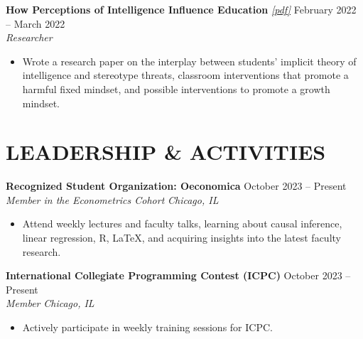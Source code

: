 \documentclass[letterpaper, 9pt]{extarticle}
\begin{document}
\noindent
\textbf{How Perceptions of Intelligence Influence Education} 
\emph{\href{https://drive.google.com/file/d/1lgQKk7_geC_NsAG5uHnPfWY3wKy38_-o/view?usp=sharing}{\color{blue} [pdf]}} 
\hfill February 2022 -- March 2022 \\
\textit{Researcher} 
\begin{itemize}
    \item Wrote a research paper on the interplay between students' implicit theory of intelligence and stereotype threats, classroom interventions that promote a harmful fixed mindset, and possible interventions to promote a growth mindset. 
\end{itemize}



\section*{LEADERSHIP \& ACTIVITIES}


\noindent
\textbf{Recognized Student Organization: Oeconomica} 
\hfill October 2023 -- Present \\
\textit{Member in the Econometrics Cohort} \hfill \textit{Chicago, IL}
\begin{itemize}
    \item Attend weekly lectures and faculty talks, learning about causal inference, linear regression, R, \LaTeX, and acquiring insights into the latest faculty research.
\end{itemize}

\noindent
\textbf{International Collegiate Programming Contest (ICPC)} 
\hfill October 2023 -- Present \\
\textit{Member} \hfill \textit{Chicago, IL}
\begin{itemize}
    \item Actively participate in weekly training sessions for ICPC.
\end{itemize}
\end{document}
